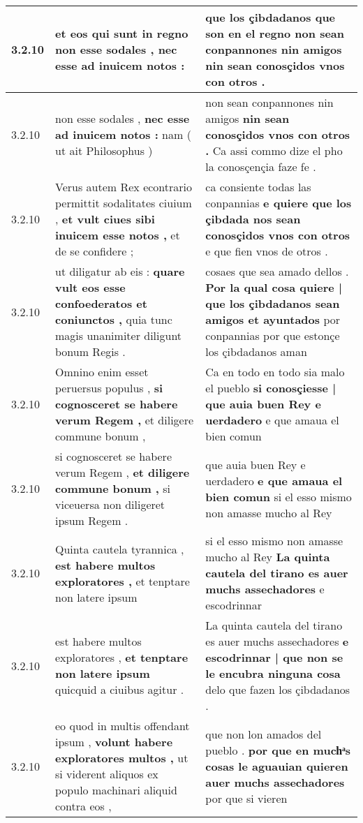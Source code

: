 \begin{tabular}{|p{1cm}|p{6.5cm}|p{6.5cm}|}
3.2.10 & et eos qui sunt in regno \textbf{ non esse sodales , } nec esse ad inuicem notos : & que los çibdadanos que son en el regno \textbf{ non sean conpannones nin amigos } nin sean conosçidos vnos con otros . \\\hline
3.2.10 & non esse sodales , \textbf{ nec esse ad inuicem notos : } nam ( ut ait Philosophus ) & non sean conpannones nin amigos \textbf{ nin sean conosçidos vnos con otros . } Ca assi commo dize el pho la conosçençia faze fe . \\\hline
3.2.10 & Verus autem Rex econtrario permittit sodalitates ciuium , \textbf{ et vult ciues sibi inuicem esse notos , } et de se confidere ; & ca consiente todas las conpannias \textbf{ e quiere que los çibdada nos sean conosçidos vnos con otros } e que fien vnos de otros . \\\hline
3.2.10 & ut diligatur ab eis : \textbf{ quare vult eos esse confoederatos et coniunctos , } quia tunc magis unanimiter diligunt bonum Regis . & cosaes que sea amado dellos . \textbf{ Por la qual cosa quiere | que los çibdadanos sean amigos et ayuntados } por conpannias por que estonçe los çibdadanos aman \\\hline
3.2.10 & Omnino enim esset peruersus populus , \textbf{ si cognosceret se habere verum Regem , } et diligere commune bonum , & Ca en todo en todo sia malo el pueblo \textbf{ si conosçiesse | que auia buen Rey e uerdadero } e que amaua el bien comun \\\hline
3.2.10 & si cognosceret se habere verum Regem , \textbf{ et diligere commune bonum , } si viceuersa non diligeret ipsum Regem . & que auia buen Rey e uerdadero \textbf{ e que amaua el bien comun } si el esso mismo non amasse mucho al Rey \\\hline
3.2.10 & Quinta cautela tyrannica , \textbf{ est habere multos exploratores , } et tenptare non latere ipsum & si el esso mismo non amasse mucho al Rey \textbf{ La quinta cautela del tirano es auer muchs assechadores } e escodrinnar \\\hline
3.2.10 & est habere multos exploratores , \textbf{ et tenptare non latere ipsum } quicquid a ciuibus agitur . & La quinta cautela del tirano es auer muchs assechadores \textbf{ e escodrinnar | que non se le encubra ninguna cosa } delo que fazen los çibdadanos . \\\hline
3.2.10 & eo quod in multis offendant ipsum , \textbf{ volunt habere exploratores multos , } ut si viderent aliquos ex populo machinari aliquid contra eos , & que non lon amados del pueblo . \textbf{ por que en muchͣs cosas le aguauian quieren auer muchs assechadores } por que si vieren \\\hline

\end{tabular}

